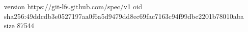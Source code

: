 version https://git-lfs.github.com/spec/v1
oid sha256:49ddcdb3e0527197aa0f6a5d9479dd8ec69fac7163c94f99dbc2201b78010aba
size 87544
